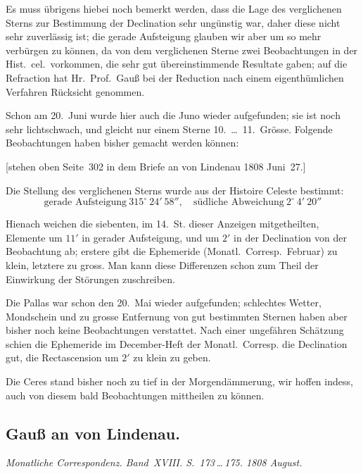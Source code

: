 \documentclass[12pt,a4paper]{book}
\begin{document}
Es muss \"ubrigens hiebei noch bemerkt werden, dass die Lage des verglichenen Sterns zur Bestimmung der Declination sehr ung\"unstig war, daher diese nicht sehr zuverl\"assig ist; die gerade Aufsteigung glauben wir aber um so mehr verb\"urgen zu k\"onnen, da von dem verglichenen Sterne zwei Beobachtungen in der Hist.~cel.~vorkommen, die sehr gut \"ubereinstimmende Resultate gaben; auf die Refraction hat Hr.~Prof.~Gau{\ss} bei der Reduction nach einem eigenth\"umlichen Verfahren R\"ucksicht genommen.

Schon am 20.~Juni wurde hier auch die Juno wieder aufgefunden; sie ist noch sehr lichtschwach, und gleicht nur einem Sterne 10.\ \ldots\ 11.~Gr\"osse. Folgende Beobachtungen haben bisher gemacht werden k\"onnen:

[stehen oben Seite~302 in dem Briefe an von Lindenau 1808 Juni~27.]

Die Stellung des verglichenen Sterns wurde aus der Histoire Celeste bestimmt:
\[\text{gerade Aufsteigung}\ 315^{\circ}\ 24'\ 58'',\quad \text{s\"udliche Abweichung}\ 2^{\circ}\ 4'\ 20''\]

Hienach weichen die siebenten, im 14.~St. dieser Anzeigen mitgetheilten, Elemente um $11'$ in gerader Aufsteigung, und um $2'$ in der Declination von der Beobachtung ab; erstere gibt die Ephemeride (Monatl.~Corresp.~Februar) zu klein, letztere zu gross. Man kann diese Differenzen schon zum Theil der Einwirkung der St\"orungen zuschreiben.

Die Pallas war schon den 20.~Mai wieder aufgefunden; schlechtes Wetter, Mondschein und zu grosse Entfernung von gut bestimmten Sternen haben aber bisher noch keine Beobachtungen verstattet. Nach einer ungef\"ahren Sch\"atzung schien die Ephemeride im December-Heft der Monatl.~Corresp. die Declination gut, die Rectascension um $2'$ zu klein zu geben.

Die Ceres stand bisher noch zu tief in der Morgend\"ammerung, wir hoffen indess, auch von diesem bald Beobachtungen mittheilen zu k\"onnen.



\newpage
\subsection*{Gau{\ss} an von Lindenau.}

\textit{Monatliche Correspondenz. Band~XVIII. S.~173\,\ldots\,175. 1808 August.}
\end{document}
